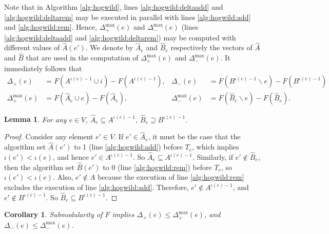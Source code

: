 \documentclass{article} %
\newtheorem{cor}[thm]{Corollary}
\newtheorem{lem}[thm]{Lemma}
\begin{document}
Note that in Algorithm \ref{alg:hogwild}, lines \ref{alg:hogwild:deltaadd} and \ref{alg:hogwild:deltarem} may be executed in parallel with lines \ref{alg:hogwild:add} and \ref{alg:hogwild:rem}.
Hence, $\Delta_+^{\max}(e)$ and $\Delta_-^{\max}(e)$ (lines \ref{alg:hogwild:deltaadd} and \ref{alg:hogwild:deltarem}) may be computed with different values of $\hat{A}(e')$.
We denote by $\hat{A}_e$ and $\hat{B}_e$ respectively the vectors of $\hat{A}$ and $\hat{B}$ that are used in the computation of $\Delta_+^{\max}(e)$ and $\Delta_-^{\max}(e)$.
It immediately follows that
\begin{align*}
  \Delta_{+}       (e) &= F(A^{\iota(e)-1}\cup i) - F(A^{\iota(e)-1}),
& \Delta_{-}       (e) &= F(B^{\iota(e)-1}\backslash e) - F(B^{\iota(e)-1})\\
  \Delta_{+}^{\max}(e) &= F(\hat{A}_e\cup e) - F(\hat{A}_e),
& \Delta_{-}^{\max}(e) &= F(\hat{B}_e\backslash e) - F(\hat{B}_e).
\end{align*}



\begin{lem}\label{lem:set_bound} For any $e\in V$, $\hat{A}_e \subseteq A^{\iota(e)-1}$, $\hat{B}_e \supseteq B^{\iota(e)-1}$.
\end{lem}
\begin{proof}
Consider any element $e'\in V$.
If $e'\in \hat{A}_e$, it must be the case that the algorithm set $\hat{A}(e')$ to 1 (line \ref{alg:hogwild:add}) before $T_e$, which implies $\iota(e') < \iota(e)$, and hence $e' \in A^{\iota(e)-1}$.
So $\hat{A}_e \subseteq A^{\iota(e)-1}$.
Similarly, if $e'\not\in \hat{B}_e$, then the algorithm set $\hat{B}(e')$ to 0 (line \ref{alg:hogwild:rem}) before $T_e$, so $\iota(e') < \iota(e)$.
Also, $e'\not\in A$ because the execution of line \ref{alg:hogwild:rem} excludes the execution of line \ref{alg:hogwild:add}.
Therefore, $e'\not\in A^{\iota(e)-1}$, and $e'\not\in B^{\iota(e)-1}$.
So $\hat{B}_e \subseteq B^{\iota(e)-1}$.
\end{proof}

\begin{cor}\label{cor:delta_bound}
Submodularity of $F$ implies
$\Delta_{+}(e) \leq \Delta_{+}^{\max}(e)$, and
$\Delta_{-}(e) \leq \Delta_{-}^{\max}(e)$.
\end{cor}
\end{document}
